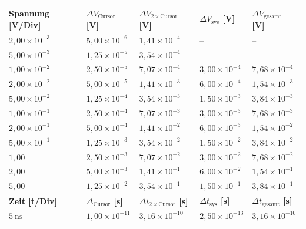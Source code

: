 \newpage

\onecolumn
\begin{table}[h!]
    \vspace{-0.73cm}
    \centering
    \begin{tabular}{l|l|l|l||l}
    \toprule
    \textbf{Spannung [V/Div]} & \textbf{$\Delta V_{\text{Cursor}}$ [V]} & \textbf{$\Delta V_{2\times \text{Cursor}}$ [V]} & \textbf{$\Delta V_{\text{sys}}$ [V]} & \textbf{$\Delta V_{\text{gesamt}}$ [V]} \\
    \midrule
    \(2,00\times 10^{-3}\) & \(5,00\times 10^{-6}\) & \(1,41\times 10^{-4}\) & -- & -- \\
    \(5,00\times 10^{-3}\) & \(1,25\times 10^{-5}\) & \(3,54\times 10^{-4}\) & -- & -- \\
    \(1,00\times 10^{-2}\) & \(2,50\times 10^{-5}\) & \(7,07\times 10^{-4}\) & \(3,00\times 10^{-4}\) & \(7,68\times 10^{-4}\) \\
    \(2,00\times 10^{-2}\) & \(5,00\times 10^{-5}\) & \(1,41\times 10^{-3}\) & \(6,00\times 10^{-4}\) & \(1,54\times 10^{-3}\) \\
    \(5,00\times 10^{-2}\) & \(1,25\times 10^{-4}\) & \(3,54\times 10^{-3}\) & \(1,50\times 10^{-3}\) & \(3,84\times 10^{-3}\) \\
    \(1,00\times 10^{-1}\) & \(2,50\times 10^{-4}\) & \(7,07\times 10^{-3}\) & \(3,00\times 10^{-3}\) & \(7,68\times 10^{-3}\) \\
    \(2,00\times 10^{-1}\) & \(5,00\times 10^{-4}\) & \(1,41\times 10^{-2}\) & \(6,00\times 10^{-3}\) & \(1,54\times 10^{-2}\) \\
    \(5,00\times 10^{-1}\) & \(1,25\times 10^{-3}\) & \(3,54\times 10^{-2}\) & \(1,50\times 10^{-2}\) & \(3,84\times 10^{-2}\) \\
    \(1,00\) & \(2,50\times 10^{-3}\) & \(7,07\times 10^{-2}\) & \(3,00\times 10^{-2}\) & \(7,68\times 10^{-2}\) \\
    \(2,00\) & \(5,00\times 10^{-3}\) & \(1,41\times 10^{-1}\) & \(6,00\times 10^{-2}\) & \(1,54\times 10^{-1}\) \\
    \(5,00\) & \(1,25\times 10^{-2}\) & \(3,54\times 10^{-1}\) & \(1,50\times 10^{-1}\) & \(3,84\times 10^{-1}\) \\
    \midrule
    \midrule
    \textbf{Zeit [t/Div]} & \textbf{$\Delta_{\text{Cursor}}$ [s]} & \textbf{$\Delta t_{2\times \text{Cursor}}$ [s]} & \textbf{$\Delta t_{\text{sys}}$ [s]} & \textbf{$\Delta t_{\text{gesamt}}$ [s]} \\
    \midrule
\(5~\text{ns}\) & \(1,00\times 10^{-11}\) & \(3,16\times 10^{-10}\) & \(2,50\times 10^{-13}\) & \(3,16\times 10^{-10}\) \\

\end{tabular}
\end{table}
